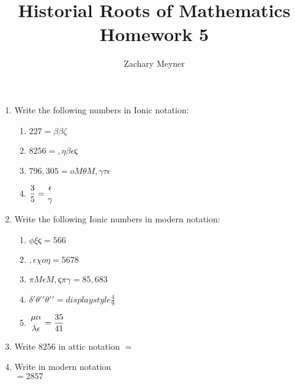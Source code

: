 \documentclass[12pt]{article}
\title{\large Historial Roots of Mathematics Homework 5}
\author{\large Zachary Meyner}
\date{}
\begin{document}
\maketitle

\begin{enumerate}
    \item Write the following numbers in Ionic notation:
    \begin{enumerate}
        \item $227=\beta\beta\zeta$
        \item $8256 = ,\eta\beta\epsilon $ϛ
        \item $796,305=oM\theta M,\gamma\tau\epsilon$
        \item $\displaystyle\frac{3}{5}=\genfrac{}{}{0pt}{0}{\epsilon}{\gamma}$
    \end{enumerate}
    \item Write the following Ionic numbers in modern notation:
    \begin{enumerate}
        \item $\phi\xi \text{ϛ} = 566$
        \item $,\epsilon\chi o\eta=5678$
        \item $\pi M\epsilon M,\text{ϛ}\pi\gamma=85,683$
        \item $\delta\prime\theta\prime\prime\theta\prime\prime=displaystyle\frac{4}{9}$
        \item $\genfrac{}{}{0pt}{0}{\mu\alpha}{\lambda\epsilon}=\displaystyle\frac{35}{41}$
    \end{enumerate}
    \item Write 8256 in attic notation
    $=$\setmainfont{quivira.otf}\setmainfont{STIXTwoText-Regular.otf}
    \item Write \setmainfont{quivira.otf} \setmainfont{STIXTwoText-Regular.otf} in modern notation \\
    $=2857$ 
\end{enumerate}
\end{document}
